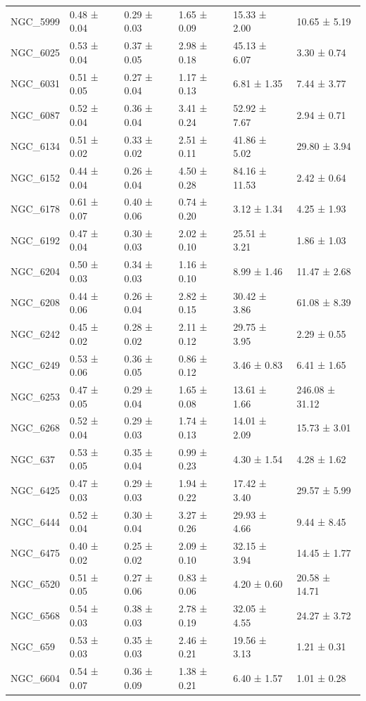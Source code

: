 \begin{tabular}{llllll}
NGC_5999 & 0.48 ± 0.04 & 0.29 ± 0.03 & 1.65 ± 0.09 & 15.33 ± 2.00 & 10.65 ± 5.19 \\
NGC_6025 & 0.53 ± 0.04 & 0.37 ± 0.05 & 2.98 ± 0.18 & 45.13 ± 6.07 & 3.30 ± 0.74 \\
NGC_6031 & 0.51 ± 0.05 & 0.27 ± 0.04 & 1.17 ± 0.13 & 6.81 ± 1.35 & 7.44 ± 3.77 \\
NGC_6087 & 0.52 ± 0.04 & 0.36 ± 0.04 & 3.41 ± 0.24 & 52.92 ± 7.67 & 2.94 ± 0.71 \\
NGC_6134 & 0.51 ± 0.02 & 0.33 ± 0.02 & 2.51 ± 0.11 & 41.86 ± 5.02 & 29.80 ± 3.94 \\
NGC_6152 & 0.44 ± 0.04 & 0.26 ± 0.04 & 4.50 ± 0.28 & 84.16 ± 11.53 & 2.42 ± 0.64 \\
NGC_6178 & 0.61 ± 0.07 & 0.40 ± 0.06 & 0.74 ± 0.20 & 3.12 ± 1.34 & 4.25 ± 1.93 \\
NGC_6192 & 0.47 ± 0.04 & 0.30 ± 0.03 & 2.02 ± 0.10 & 25.51 ± 3.21 & 1.86 ± 1.03 \\
NGC_6204 & 0.50 ± 0.03 & 0.34 ± 0.03 & 1.16 ± 0.10 & 8.99 ± 1.46 & 11.47 ± 2.68 \\
NGC_6208 & 0.44 ± 0.06 & 0.26 ± 0.04 & 2.82 ± 0.15 & 30.42 ± 3.86 & 61.08 ± 8.39 \\
NGC_6242 & 0.45 ± 0.02 & 0.28 ± 0.02 & 2.11 ± 0.12 & 29.75 ± 3.95 & 2.29 ± 0.55 \\
NGC_6249 & 0.53 ± 0.06 & 0.36 ± 0.05 & 0.86 ± 0.12 & 3.46 ± 0.83 & 6.41 ± 1.65 \\
NGC_6253 & 0.47 ± 0.05 & 0.29 ± 0.04 & 1.65 ± 0.08 & 13.61 ± 1.66 & 246.08 ± 31.12 \\
NGC_6268 & 0.52 ± 0.04 & 0.29 ± 0.03 & 1.74 ± 0.13 & 14.01 ± 2.09 & 15.73 ± 3.01 \\
NGC_637 & 0.53 ± 0.05 & 0.35 ± 0.04 & 0.99 ± 0.23 & 4.30 ± 1.54 & 4.28 ± 1.62 \\
NGC_6425 & 0.47 ± 0.03 & 0.29 ± 0.03 & 1.94 ± 0.22 & 17.42 ± 3.40 & 29.57 ± 5.99 \\
NGC_6444 & 0.52 ± 0.04 & 0.30 ± 0.04 & 3.27 ± 0.26 & 29.93 ± 4.66 & 9.44 ± 8.45 \\
NGC_6475 & 0.40 ± 0.02 & 0.25 ± 0.02 & 2.09 ± 0.10 & 32.15 ± 3.94 & 14.45 ± 1.77 \\
NGC_6520 & 0.51 ± 0.05 & 0.27 ± 0.06 & 0.83 ± 0.06 & 4.20 ± 0.60 & 20.58 ± 14.71 \\
NGC_6568 & 0.54 ± 0.03 & 0.38 ± 0.03 & 2.78 ± 0.19 & 32.05 ± 4.55 & 24.27 ± 3.72 \\
NGC_659 & 0.53 ± 0.03 & 0.35 ± 0.03 & 2.46 ± 0.21 & 19.56 ± 3.13 & 1.21 ± 0.31 \\
NGC_6604 & 0.54 ± 0.07 & 0.36 ± 0.09 & 1.38 ± 0.21 & 6.40 ± 1.57 & 1.01 ± 0.28 \\

\end{tabular}
